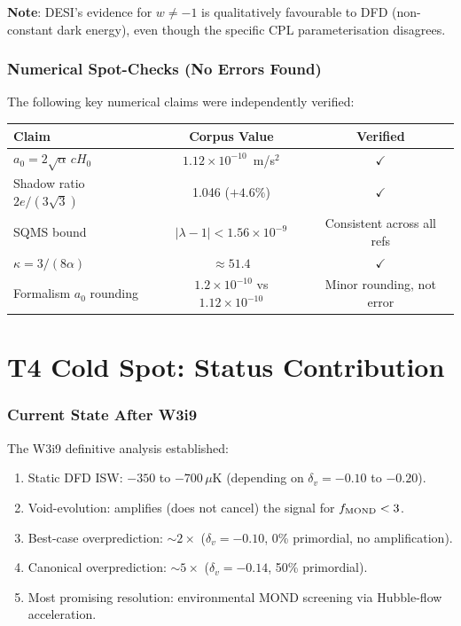\documentclass[11pt]{article}
\newcommand{\ee}[1]{\times 10^{#1}}
\newcommand{\lamdiff}{|\lambda{-}1|}
\begin{document}
\textbf{Note}: DESI's evidence for $w \neq -1$ is qualitatively
favourable to DFD (non-constant dark energy), even though the specific
CPL parameterisation disagrees.


\section{Numerical Spot-Checks (No Errors Found)}
\label{sec:spot-checks}

The following key numerical claims were independently verified:

\begin{center}
\begin{tabular}{lcc}
\toprule
\textbf{Claim} & \textbf{Corpus Value} & \textbf{Verified} \\
\midrule
$a_0 = 2\sqrt{\alpha}\,cH_0$ & $1.12\ee{-10}$~m/s$^2$ & $\checkmark$ \\
Shadow ratio $2e/(3\sqrt{3})$ & 1.046 ($+4.6\%$) & $\checkmark$ \\
SQMS bound & $\lamdiff < 1.56\ee{-9}$ & Consistent across all refs \\
$\kappa = 3/(8\alpha)$ & $\approx 51.4$ & $\checkmark$ \\
Formalism $a_0$ rounding & $1.2\ee{-10}$ vs $1.12\ee{-10}$ & Minor
  rounding, not error \\
\bottomrule
\end{tabular}
\end{center}


\part{T4 Cold Spot: Status Contribution}

\section{Current State After W3i9}

The W3i9 definitive analysis established:
\begin{enumerate}[nosep]
\item Static DFD ISW: $-350$ to $-700\,\mu$K (depending on
  $\delta_v = -0.10$ to $-0.20$).
\item Void-evolution: amplifies (does not cancel) the signal for
  $f_{\rm MOND} < 3$.
\item Best-case overprediction: $\sim 2\times$ ($\delta_v = -0.10$,
  0\% primordial, no amplification).
\item Canonical overprediction: $\sim 5\times$ ($\delta_v = -0.14$,
  50\% primordial).
\item Most promising resolution: environmental MOND screening via
  Hubble-flow acceleration.
\end{enumerate}
\end{document}
